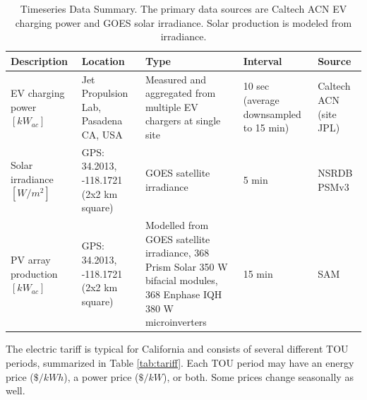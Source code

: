 \documentclass[journal,article,submit,pdftex,moreauthors]{Definitions/mdpi}
\begin{document}
\begin{table}[!h]
  \centering
  \caption{Timeseries Data Summary. The primary data sources are Caltech ACN EV charging power and GOES solar irradiance. Solar production is modeled from irradiance.}
  \label{tab:data-summary}
  \begin{tabularx}{\linewidth}{XXXXX}
    \toprule
    Description                     & Location                                & Type                                                                                                                  & Interval                               & Source                           \\
    \midrule
    EV charging power $[kW_{ac}]$   & Jet Propulsion Lab, Pasadena CA, USA    & Measured and aggregated from multiple  EV chargers at single site                                                     & 10 sec (average downsampled to 15 min) & Caltech ACN (site JPL) \cite{Lee2021} \\
    Solar irradiance $[W/m^2]$      & GPS: 34.2013, -118.1721 (2x2 km square) & GOES satellite irradiance                                                                                             & 5 min                                  & NSRDB PSMv3 \cite{Sengupta2018}  \\
    PV array production $[kW_{ac}]$ & GPS: 34.2013, -118.1721 (2x2 km square) & Modelled from GOES satellite irradiance, 368 Prism Solar 350 W bifacial modules, 368 Enphase IQH 380 W microinverters & 15 min                                 & SAM \cite{NREL2022}              \\
    \bottomrule
  \end{tabularx}
\end{table}

The electric tariff is typical for California and consists of several different TOU periods, summarized in Table \ref{tab:tariff}. Each TOU period may have an energy price (\(\$/kWh\)), a power price (\(\$/kW\)), or both. Some prices change seasonally as well. 
\end{document}
